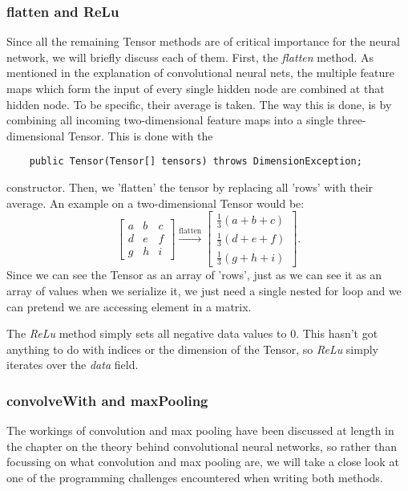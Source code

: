 \documentclass[12pt, titlepage]{article}
\begin{document}
    \subsubsection{flatten and ReLu}
    Since all the remaining Tensor methods are of critical importance for the neural network, we will briefly discuss each of them. First, the \textit{flatten} method. As mentioned in the explanation of convolutional neural nets, the multiple feature maps which form the input of every single hidden node are combined at that hidden node. To be specific, their average is taken. The way this is done, is by combining all incoming two-dimensional feature maps into a single three-dimensional Tensor. This is done with the
    \begin{lstlisting}
    public Tensor(Tensor[] tensors) throws DimensionException;
    \end{lstlisting}
    constructor. Then, we 'flatten' the tensor by replacing all 'rows' with their average. An example on a two-dimensional Tensor would be:
    \begin{equation*}
    \begin{bmatrix}
    a &b &c\\
    d &e &f\\
    g &h &i
    \end{bmatrix}\stackrel{\text{flatten}}{\longrightarrow}
    \begin{bmatrix}
    \frac13(a+b+c)\\
    \frac13(d+e+f)\\
    \frac13(g+h+i)
    \end{bmatrix}.
    \end{equation*}
    Since we can see the Tensor as an array of 'rows', just as we can see it as an array of values when we serialize it, we just need a single nested for loop and we can pretend we are accessing element in a matrix.
    
    The \textit{ReLu} method simply sets all negative data values to $0$. This hasn't got anything to do with indices or the dimension of the Tensor, so \textit{ReLu} simply iterates over the \textit{data} field.
    
    \subsubsection{convolveWith and maxPooling}
    The workings of convolution and max pooling have been discussed at length in the chapter on the theory behind convolutional neural networks, so rather than focussing on what convolution and max pooling are, we will take a close look at one of the programming challenges encountered when writing both methods.
    
\end{document}
